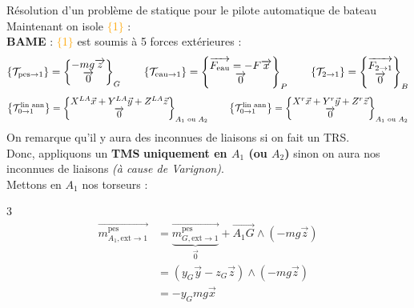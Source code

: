 \documentclass{article} %
\begin{document}
{\begin{exemple}{Résolution d'un problème de 
statique pour le pilote automatique de bateau}
Maintenant on isole \textcolor{orange}{$\{$1$\}$} :\\
\textbf{BAME} : \textcolor{orange}{$\{$1$\}$} est soumis à 5 forces extérieures :
$$\left\{ \mathcal{T}_{\text{pes} \to 1} 
\right\} = \begin{Bmatrix} -mg\overrightarrow{z} \\ \overrightarrow{0} \end{Bmatrix}_{G} \hspace*{20pt}\left\{ \mathcal{T}_{\text{eau} \to 1} \right\} = \begin{Bmatrix} \overrightarrow{F_{\text{eau}}}=-F\overrightarrow{x} \\ \overrightarrow{0} \end{Bmatrix}_{P} \hspace*{20pt} \left\{ \mathcal{T}_{2 \to 1} \right\} = \begin{Bmatrix} \overrightarrow{F_{2 \to 1}} \\ \overrightarrow{0} \end{Bmatrix}_{B} $$$$\left\{ \mathcal{T}_{0 \to 1}^{\text{lin ann}} \right\} = \begin{Bmatrix} X^{LA}\vec{x}+Y^{LA}\vec{y}+Z^{LA}\vec{z} \\ \overrightarrow{0} \end{Bmatrix}_{A_1\text{ ou }A_2} \hspace*{20pt} \left\{ \mathcal{T}_{0 \to 1}^{\text{lin ann}} \right\} = \begin{Bmatrix} X^{r}\vec{x}+Y^{r}\vec{y}+Z^{r}\vec{z} \\ \overrightarrow{0} \end{Bmatrix}_{A_1\text{ ou }A_2}$$
On remarque qu'il y aura des inconnues de liaisons si on fait un TRS.\\
Donc, appliquons un \textbf{TMS} \textbf{uniquement en $A_1$ (ou $A_2$)} sinon on aura nos inconnues de liaisons \textit{(à cause de Varignon)}.\\
Mettons en $A_1$ nos torseurs :
\begin{multicols}{3}
\noindent \begin{align*}
\overrightarrow{m_{{A_1},\text{ext}\to1}^\text{pes}}&=\underset{\overrightarrow{0}}{\underbrace{\overrightarrow{m_{G,\text{ext}\to 1}^\text{pes}}}}+\overrightarrow{A_1G}\wedge(-mg\overrightarrow{z})\\
&=(y_G\overrightarrow{y}-z_G\overrightarrow{z})\wedge(-mg\overrightarrow{z})\\
&=-y_Gmg\overrightarrow{x}
\end{align*}

\end{multicols}
\end{exemple}}
\end{document}
